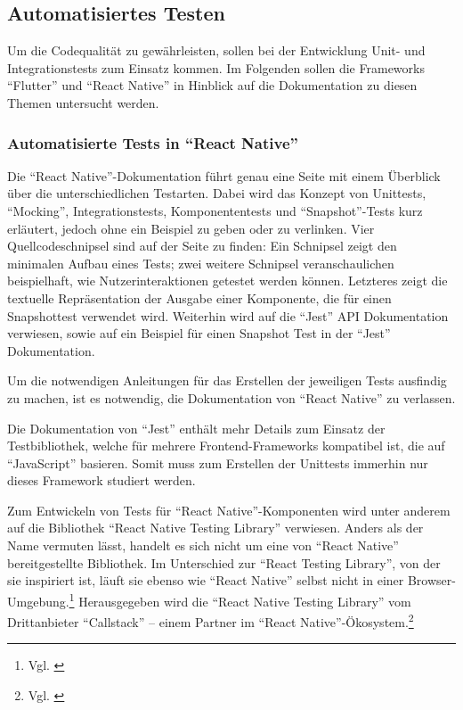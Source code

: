  


\subsection{Automatisiertes Testen}
Um die Codequalität zu gewährleisten,
sollen bei der Entwicklung Unit- und Integrationstests zum Einsatz kommen.
Im Folgenden sollen die Frameworks \enquote{Flutter} und \enquote{React Native} in Hinblick auf die Dokumentation zu diesen Themen untersucht werden. 

\subsubsection{Automatisierte Tests in \enquote{React Native}} Die \enquote{React Native}-Dokumentation führt genau eine Seite mit einem Überblick über die unterschiedlichen Testarten.
Dabei wird das Konzept von Unittests, \enquote{Mocking}, Integrationstests, Komponententests und \enquote{Snapshot}-Tests kurz erläutert, jedoch ohne ein Beispiel zu geben oder zu verlinken.
Vier Quellcodeschnipsel sind auf der Seite zu finden: Ein Schnipsel zeigt den minimalen Aufbau eines Tests; zwei weitere Schnipsel veranschaulichen beispielhaft, wie Nutzerinteraktionen getestet werden können.
Letzteres zeigt die textuelle Repräsentation der Ausgabe einer Komponente, die für einen Snapshottest verwendet wird.
Weiterhin wird auf die \enquote{Jest} API Dokumentation verwiesen, sowie auf ein Beispiel für einen Snapshot Test in der \enquote{Jest} Dokumentation.

Um die notwendigen Anleitungen für das Erstellen der jeweiligen Tests ausfindig zu machen, ist es notwendig, die Dokumentation von \enquote{React Native} zu verlassen.

Die Dokumentation von \enquote{Jest} enthält mehr Details zum Einsatz der Testbibliothek, welche für mehrere Frontend-Frameworks kompatibel ist,
die auf \enquote{JavaScript} basieren.
Somit muss zum Erstellen der Unittests immerhin nur dieses Framework studiert werden.

Zum Entwickeln von Tests für \enquote{React Native}-Komponenten wird unter anderem auf die Bibliothek \enquote{React Native Testing Library} verwiesen.
Anders als der Name vermuten lässt, handelt es sich nicht um eine von \enquote{React Native} bereitgestellte Bibliothek.
Im Unterschied zur \enquote{React Testing Library}, von der sie inspiriert ist, läuft sie  ebenso  wie \enquote{React Native} selbst nicht in einer Browser-Umgebung.\footnote{Vgl. \cite{NativeTestingLibraryIntroduction}}
Herausgegeben wird die \enquote{React Native Testing Library} vom Drittanbieter \enquote{Callstack} -- einem Partner im \enquote{React Native}-Ökosystem.\footnote{Vgl. \cite{TheReactNativeEcosystem}}

